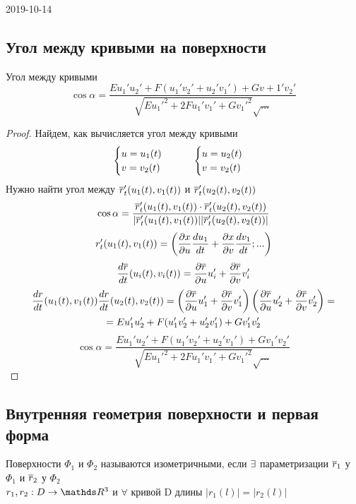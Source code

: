 \documentclass[main]{subfiles}
\begin{document}
	\begin{lect} {2019-10-14}
		\subsection{Угол между кривыми на поверхности}
		\begin{theorem}
	    Угол между кривыми
	    \[\cos \alpha = \dfrac{E u_1' u_2' + F(u_1' v_2' + u_2' v_1') + G v+1' v_2'}{\sqrt{E u_1'^2 + 2 F u_1' v_1' + G v_1'^2} \sqrt{...}}\]
	  \end{theorem}
	  \begin{proof}
	    Найдем, как вычисляется угол между кривыми
	    \[\begin{cases}
	      u=u_1(t)\\
	      v=v_2(t)
	    \end{cases} \qquad
	    \begin{cases}
	      u=u_2(t)\\
	      v=v_2(t)
	    \end{cases}\]
	    Нужно найти угол между $\overline{r}_t'(u_1(t), v_1(t))$ и $\overline{r}_t'(u_2(t), v_2(t))$
	    \[\cos \alpha = \dfrac{\overline{r}_t'(u_1(t), v_1(t)) \cdot \overline{r}_t'(u_2(t), v_2(t))}{|\overline{r}_t'(u_1(t), v_1(t))| |\overline{r}_t'(u_2(t), v_2(t))|}\]
	    \[r_t'(u_1(t), v_1(t)) = \left(\dfrac{\partial x}{\partial u} \dfrac{d u_1}{dt} + \dfrac{\partial x}{\partial v} \dfrac{d v_1}{dt};...\right)\]
	    \[\dfrac{d \overline{r}}{dt} (u_i(t), v_i(t)) = \dfrac{\partial \overline{r}}{\partial u} u_i' + \dfrac{\partial \overline{r}}{\partial v} v_i'\]
	    \begin{multline*}
	        \dfrac{dr}{dt}(u_1(t),v_1(t)) \dfrac{dr}{dt}(u_2(t),v_2(t)) = \left(\dfrac{\partial \overline{r}}{\partial u} u_1' + \dfrac{\partial \overline{r}}{\partial v} v_1'\right) \left(\dfrac{\partial \overline{r}}{\partial u} u_2' + \dfrac{\partial \overline{r}}{\partial v} v_2'\right) =\\
            = E u_1' u_2' + F(u_1' v_2'+ u_2' v_1') + G v_1' v_2'
	    \end{multline*}
	    \[\cos \alpha = \dfrac{E u_1' u_2' + F(u_1' v_2' + u_2' v_1') + G v_1' v_2'}{\sqrt{E u_1'^2 + 2 F u_1' v_1' + G v_1'^2} \sqrt{...}}\]
	  \end{proof}

	  \subsection{Внутренняя геометрия поверхности и первая форма}

	  \begin{definition}
	    Поверхности $\Phi_1$ и $\Phi_2$ называются изометричными, если $\exists$ параметризации $\overline{r}_1$ у $\Phi_1$ и $\overline{r}_2$ у $\Phi_2$\\
	    $r_1,r_2: D \ra \R^3$ и $\forall$ кривой D длины $|r_1(l)| = |r_2(l)|$
	  \end{definition}


\end{lect}
\end{document}
